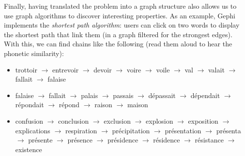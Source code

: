 Finally, having translated the problem into a graph structure also allows us to use graph algorithms to discover interesting properties. As an example, Gephi implements the \textit{shortest path algorithm}: users can click on two words to display the shortest path that link them (in a graph filtered for the strongest edges). With this, we can find chains like the following (read them aloud to hear the phonetic similarity):
\begin{itemize}
    \item trottoir $\rightarrow$ entrevoir $\rightarrow$ devoir $\rightarrow$ voire $\rightarrow$ voile $\rightarrow$ val $\rightarrow$ valait $\rightarrow$ fallait $\rightarrow$ falaise
    \item falaise $\rightarrow$ fallait $\rightarrow$ palais $\rightarrow$ passais $\rightarrow$ dépassait $\rightarrow$ dépendait $\rightarrow$ répondait $\rightarrow$ répond $\rightarrow$ raison $\rightarrow$ maison
    \item confusion $\rightarrow$ conclusion $\rightarrow$ exclusion $\rightarrow$ explosion $\rightarrow$ exposition $\rightarrow$ explications $\rightarrow$ respiration $\rightarrow$ précipitation $\rightarrow$ présentation $\rightarrow$ présenta $\rightarrow$ présente $\rightarrow$ présence $\rightarrow$ présidence $\rightarrow$ résidence $\rightarrow$ résistance $\rightarrow$ existence
\end{itemize}
